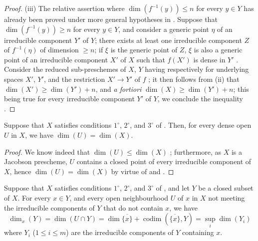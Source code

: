\begin{proof}
(iii) The relative assertion where $\dim(f^{-1}(y))\leq n$ for every $y\in Y$ has already been proved under more general hypotheses in .
Suppose that $\dim(f^{-1}(y))\geq n$ for every $y\in Y$, and consider a generic point $\eta$ of an irreducible component $Y'$ of $Y$; there exists at least one irreducible component $Z$ of $f^{-1}(\eta)$ of dimension $\geq n$; if $\xi$ is the generic point of $Z$, $\xi$ is also a generic point of an irreducible component $X'$ of $X$ such that $f(X')$ is dense in $Y'$ .
Consider the reduced sub-preschemes of $X$, $Y$ having respectively for underlying spaces $X'$, $Y'$, and the restriction $X'\to Y'$ of $f$ ; it then follows from (ii) that $\dim(X')\geq\dim(Y')+n$, and \emph{a fortiori} $\dim(X)\geq\dim(Y')+n$; this being true for every irreducible component $Y'$ of $Y$, we conclude the inequality .
\end{proof}

\begin{corollary}[10.6.2]
\label{IV.10.6.2}
Suppose that $X$ satisfies conditions $1^\circ$, $2^\circ$, and $3^\circ$ of .
Then, for every dense open $U$ in $X$, we have $\dim(U)=\dim(X)$.
\end{corollary}

\begin{proof}
We know indeed that $\dim(U)\leq\dim(X)$ ; furthermore, as $X$ is a Jacobson prescheme, $U$ contains a closed point of every irreducible component of $X$, hence $\dim(U)=\dim(X)$ by virtue of  and .
\end{proof}

\begin{proposition}[10.6.3]
\label{IV.10.6.3}
Suppose that $X$ satisfies conditions $1^\circ$, $2^\circ$, and $3^\circ$ of , and let $Y$ be a closed subset of $X$.
For every $x\in Y$, and every open neighbourhood $U$ of $x$ in $X$ not meeting the irreducible components of $Y$ that do not contain $x$, we have
\begin{equation}
\label{IV.10.6.3.1}
\tag{10.6.3.1}
\dim_x(Y)=\dim(U\cap Y)=\dim\overline{\{x\}}+\operatorname{codim}(\overline{\{x\}},Y)=\sup_i\dim(Y_i)
\end{equation}
where $Y_i$ ($1\leq i\leq m$) are the irreducible components of $Y$ containing $x$.
\end{proposition}

